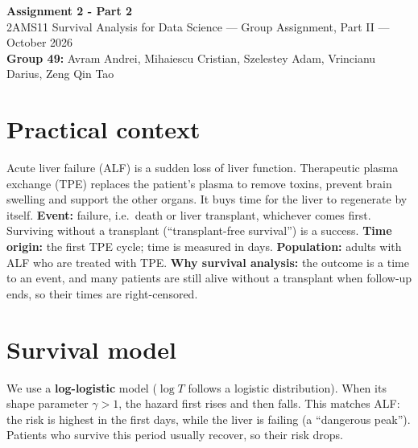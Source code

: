 \documentclass[10pt,a4paper]{article}
\begin{document}
\begin{center}
{\large\bfseries Assignment 2 - Part 2}\\[3pt]
{\small 2AMS11 Survival Analysis for Data Science --- Group Assignment, Part II --- October 2026}\\[1pt]
{\small\textbf{Group 49:} Avram Andrei, Mihaiescu Cristian, Szelestey Adam, Vrincianu Darius, Zeng Qin Tao}
\end{center}
\vspace{-8pt}

\section{Practical context}
Acute liver failure (ALF) is a sudden loss of liver function. Therapeutic plasma exchange (TPE) replaces the patient's plasma to remove toxins, prevent brain swelling and support the other organs. It buys time for the liver to regenerate by itself.
\textbf{Event:} failure, i.e.\ death or liver transplant, whichever comes first. Surviving without a transplant (``transplant-free survival'') is a success.
\textbf{Time origin:} the first TPE cycle; time is measured in days.
\textbf{Population:} adults with ALF who are treated with TPE.
\textbf{Why survival analysis:} the outcome is a time to an event, and many patients are still alive without a transplant when follow-up ends, so their times are right-censored.

\section{Survival model}
We use a \textbf{log-logistic} model ($\log T$ follows a logistic distribution). When its shape parameter $\gamma>1$, the hazard first rises and then falls. This matches ALF: the risk is highest in the first days, while the liver is failing (a ``dangerous peak''). Patients who survive this period usually recover, so their risk drops.
\end{document}
